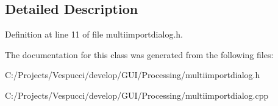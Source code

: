 \subsection{Detailed Description}


Definition at line 11 of file multiimportdialog.\+h.



The documentation for this class was generated from the following files\+:\begin{DoxyCompactItemize}
\item 
C\+:/\+Projects/\+Vespucci/develop/\+G\+U\+I/\+Processing/multiimportdialog.\+h\item 
C\+:/\+Projects/\+Vespucci/develop/\+G\+U\+I/\+Processing/multiimportdialog.\+cpp\end{DoxyCompactItemize}
